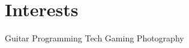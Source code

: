 \documentclass[]{deedy-resume-openfont}
\begin{document}
\section{Interests}
Guitar\textbullet{} Programming\textbullet{} Tech\textbullet{} Gaming \textbullet{} Photography 
\sectionsep
\end{document}
